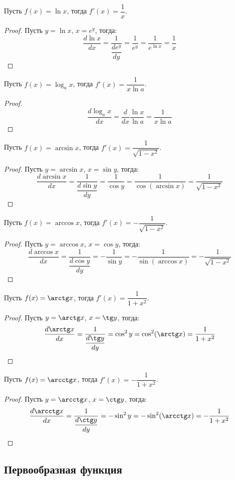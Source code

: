\documentclass[12pt]{article}
\begin{document}
\begin{statement}
    Пусть $f(x)=\ln x$, тогда $f'(x)=\dfrac{1}{x}$.
\end{statement}
\begin{proof}
    Пусть $y=\ln x$, $x=e^y$, тогда:
    $$\frac{d\ln x}{dx}=\frac{1}{\dfrac{de^y}{dy}}=\frac{1}{e^y}=\frac{1}{e^{\ln x}}=\frac{1}{x}$$
\end{proof}
\begin{statement}
    Пусть $f(x)=\log_a x$, тогда $f'(x)=\dfrac{1}{x\ln a}$.
\end{statement}
\begin{proof}
    $$\frac{d\log_a x}{dx}=\frac{d}{dx}\frac{\ln x}{\ln a}=\frac{1}{x\ln a}$$
\end{proof}
\begin{statement}
    Пусть $f(x)=\arcsin x$, тогда $f'(x)=\dfrac{1}{\sqrt{1-x^2}}$.
\end{statement}
\begin{proof}
    Пусть $y=\arcsin x$, $x=\sin y$, тогда:
    $$\frac{d\arcsin x}{dx}=\frac{1}{\dfrac{d\sin y}{dy}}=\frac{1}{\cos y}=\frac{1}{\cos(\arcsin x)}=\frac{1}{\sqrt{1-x^2}}$$
\end{proof}
\begin{statement}
    Пусть $f(x)=\arccos x$, тогда $f'(x)=-\dfrac{1}{\sqrt{1-x^2}}$.
\end{statement}
\begin{proof}
    Пусть $y=\arccos x$, $x=\cos y$, тогда:
    $$\frac{d\arccos x}{dx}=\frac{1}{\dfrac{d\cos y}{dy}}=-\frac{1}{\sin y}=-\frac{1}{\sin(\arccos x)}=-\frac{1}{\sqrt{1-x^2}}$$
\end{proof}
\begin{statement}
    Пусть $f(x)=\arctg x$, тогда $f'(x)=\dfrac{1}{1+x^2}$.
\end{statement}
\begin{proof}
    Пусть $y=\arctg x$, $x=\tg y$, тогда:
    $$\frac{d\arctg x}{dx}=\frac{1}{\dfrac{d\tg y}{dy}}=\cos^2y=\cos^2(\arctg x)=\frac{1}{1+x^2}$$
\end{proof}
\begin{statement}
    Пусть $f(x)=\arcctg x$, тогда $f'(x)=-\dfrac{1}{1+x^2}$.
\end{statement}
\begin{proof}
    Пусть $y=\arcctg x$, $x=\ctg y$, тогда:
    $$\frac{d\arcctg x}{dx}=\frac{1}{\dfrac{d\ctg y}{dy}}=-\sin^2y=-\sin^2(\arcctg x)=-\frac{1}{1+x^2}$$
\end{proof}

\subsection{Первообразная функция}
\end{document}
